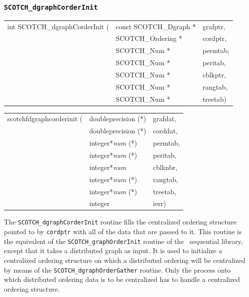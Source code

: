 \subsubsection{{\tt SCOTCH\_dgraphCorderInit}}
\label{sec-lib-func-dgraphcorderinit}

\begin{itemize}
\progsyn

{\tt\begin{tabular}{l@{}ll}
int SCOTCH\_dgraphCorderInit ( & const SCOTCH\_Dgraph * & grafptr, \\
                               & SCOTCH\_Ordering *     & cordptr, \\
                               & SCOTCH\_Num *          & permtab, \\
                               & SCOTCH\_Num *          & peritab, \\
                               & SCOTCH\_Num *          & cblkptr, \\
                               & SCOTCH\_Num *          & rangtab, \\
                               & SCOTCH\_Num *          & treetab)
\end{tabular}}

{\tt\begin{tabular}{l@{}ll}
scotchfdgraphcorderinit ( & doubleprecision (*)   & grafdat, \\
                          & doubleprecision (*)   & corddat, \\
                          & integer*{\it num} (*) & permtab, \\
                          & integer*{\it num} (*) & peritab, \\
                          & integer*{\it num}     & cblknbr, \\
                          & integer*{\it num} (*) & rangtab, \\
                          & integer*{\it num} (*) & treetab, \\
                          & integer               & ierr)
\end{tabular}}

\progdes

The {\tt SCOTCH\_dgraph\lbt Corder\lbt Init} routine fills the
centralized ordering structure pointed to by {\tt cordptr} with all of
the data that are passed to it. This routine is the equivalent of the
{\tt SCOTCH\_\lbt graph\lbt Order\lbt Init} routine of the
\scotch\ sequential library, except that it takes a distributed graph
as input. It is used to initialize a centralized ordering structure on
which a distributed ordering will be centralized by means of the
{\tt SCOTCH\_\lbt dgraph\lbt Order\lbt Gather} routine. Only the
process onto which distributed ordering data is to be centralized has
to handle a centralized ordering structure.


\end{itemize}
